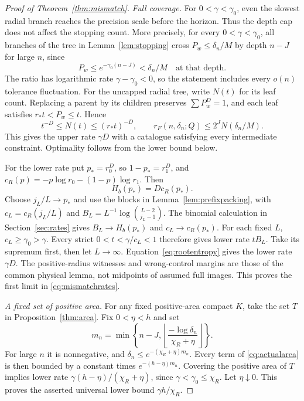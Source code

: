 \documentclass[11pt]{amsart}
\theoremstyle{definition}
\theoremstyle{remark}
\numberwithin{equation}{section}
\begin{document}
\begin{proof}[Proof of Theorem~\ref{thm:mismatch}]
\emph{Full coverage.}
For $0<\gamma<\gamma_0$, even the slowest radial branch reaches
the precision scale before the horizon. Thus the depth cap does
not affect the stopping count. More precisely, for every
$0<\gamma<\gamma_0$,
all branches of the tree in Lemma~\ref{lem:stopping} cross
$P_w\le\delta_n/M$ by depth $n-J$ for large $n$, since
\[
P_w\le e^{-\gamma_0(n-J)}<\delta_n/M
       \quad\text{at that depth}.
\]
The ratio has logarithmic rate $\gamma-\gamma_0<0$, so the
statement includes every $o(n)$ tolerance fluctuation.
For the uncapped radial tree, write $N(t)$ for its leaf count.
Replacing a parent by its children preserves $\sum P_w^D=1$,
and each leaf satisfies $r_*t<P_w\le t$. Hence
\begin{equation}\label{eq:mismatchtree}
t^{-D}\le N(t)\le(r_*t)^{-D},\qquad
r_F(n,\delta_n;Q)\le2^JN(\delta_n/M).
\end{equation}
This gives the upper rate $\gamma D$ with a catalogue satisfying
every intermediate constraint. Optimality follows from the lower
bound below.

For the lower rate put $p_*=r_0^D$, so $1-p_*=r_1^D$, and
$c_R(p)=-p\log r_0-(1-p)\log r_1$. Then
\begin{equation}\label{eq:rootentropy}
H_b(p_*)=D c_R(p_*).
\end{equation}
Choose $j_L/L\to p_*$ and use the blocks in
Lemma~\ref{lem:prefixpacking}, with
$c_L=c_R(j_L/L)$ and $B_L=L^{-1}\log\binom{L-2}{j_L-1}$.
The binomial calculation in Section~\ref{sec:rates} gives
$B_L\to H_b(p_*)$ and $c_L\to c_R(p_*)$.
For each fixed $L$, $c_L\ge\gamma_0>\gamma$.
Every strict $0<t<\gamma/c_L<1$ therefore gives lower rate $tB_L$.
Take its supremum first, then let $L\to\infty$.
Equation~\eqref{eq:rootentropy} gives the lower rate $\gamma D$.
The positive-radius witnesses and wrong-control margins are those
of the common physical lemma, not midpoints of assumed full images.
This proves the first limit in \eqref{eq:mismatchrates}.

\smallskip
\emph{A fixed set of positive area.}
For any fixed positive-area compact $K$, take the set $T$ in
Proposition~\ref{thm:area}. Fix $0<\eta<h$ and set
\[
m_n=\min\left\{n-J,
       \left\lfloor\frac{-\log\delta_n}{\chi_R+\eta}\right\rfloor\right\}.
\]
For large $n$ it is nonnegative, and
$\delta_n\le e^{-(\chi_R+\eta)m_n}$.
Every term of \eqref{eq:actualarea} is then bounded by a constant
times $e^{-(h-\eta)m_n}$. Covering the positive area of $T$ implies
lower rate $\gamma(h-\eta)/(\chi_R+\eta)$, since
$\gamma<\gamma_0\le\chi_R$. Let $\eta\downarrow0$.
This proves the asserted universal lower bound $\gamma h/\chi_R$.


\end{proof}
\end{document}
